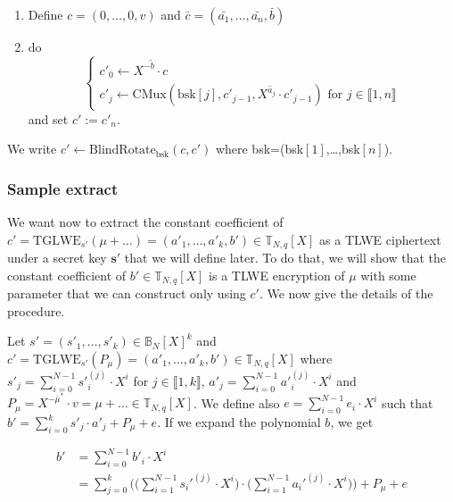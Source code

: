 \documentclass{article}
\newcommand{\T}{\mathbb{T}}
\newcommand{\B}{\mathbb{B}}
\theoremstyle{definition}
\theoremstyle{Theorem}
\begin{document}
\begin{enumerate}
    \item Define $c = (0,\ldots,0,v)$ and $\bar{c} = (\bar{a_1},\ldots,\bar{a_n},\bar{b})$
    \item do 
    \begin{equation}
        \begin{cases}
            c'_0 \gets X^{-\tilde{b}}\cdot c\\
            c'_j \gets \text{CMux}(\text{bsk}[j],c'_{j-1},X^{\tilde{a_j}}\cdot c'_{j-1}) \text{ for } j\in \llbracket 1,n \rrbracket
        \end{cases}
    \end{equation}
    and set $c' := c'_n$.
\end{enumerate}

We write $c' \gets \text{BlindRotate}_{\text{bsk}}(c,c')$ where bsk=(bsk$[1]$,\ldots,bsk$[n]$).

\subsubsection{Sample extract} \label{sample extract}

We want now to extract the constant coefficient of $c' = \text{TGLWE}_{s'}(\mu + \ldots
) = (a'_1,\ldots,a'_k,b')\in\T_{N,q}[X]$ as a TLWE ciphertext under a secret key $\mathbf{s'}$ that we will define later. To do that, we will show that the constant coefficient of $b'\in\T_{N,q}[X]$ is a TLWE encryption of $\mu$ with some parameter that we can construct only using $c'$. We now give the details of the procedure. 

Let $s'=(s'_1,\ldots,s'_k)\in\B_{N}[X]^k$ and $c' = \text{TGLWE}_{s'}(P_\mu) = (a'_1,\ldots,a'_k,b')\in\T_{N,q}[X]$ where $s'_j = \sum_{i=0}^{N-1} s'^{(j)}_i \cdot X^i$ for $j \in \llbracket 1,k\rrbracket$, $a'_j = \sum_{i=0}^{N-1} a'^{(j)}_i \cdot X^i$ and $P_{\mu} = X^{-\bar{\mu}^*}\cdot v = \mu + \ldots \in \T_{N,q}[X]$. We define also $e = \sum_{i=0}^{N-1} e_i\cdot X^i$ such that $b' = \sum_{i=0}^{k}s'_j\cdot a'_j + P_{\mu} + e$. If we expand the polynomial $b$, we get 

\begin{equation}
\begin{split}
    b' &= \sum_{i=0}^{N-1} b'_i \cdot X^i\\
    &= \sum_{j=0}^k \Big(\Big(\sum_{i=1}^{N-1} s_i'^{(j)}\cdot X^i\Big) \cdot \Big(\sum_{i=1}^{N-1} a_i'^{(j)}\cdot X^i\Big)\Big) + P_\mu + e
\end{split}
\end{equation}
\end{document}
